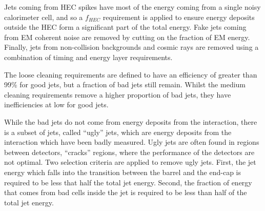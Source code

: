 Jets coming from HEC spikes have most of the energy coming from a single noisy calorimeter cell, and so a $f_{HEC}$ requirement is applied to ensure energy deposits outside the HEC form a significant part of the total energy.
Fake jets coming from EM coherent noise are removed by cutting on the fraction of EM energy.
Finally, jets from non-collision backgrounds and cosmic rays are removed using a combination of timing and energy layer requirements.

The loose cleaning requirements are defined to have an efficiency of greater than 99\% for good jets, but a fraction of bad jets still remain. 
Whilst the medium cleaning requirements remove a higher proportion of bad jets, they have inefficiencies at low \pt{} for good jets. 

While the bad jets do not come from energy deposits from the interaction, there is a subset of jets, called ``ugly'' jets, which are energy deposits from the interaction which have been badly measured. 
Ugly jets are often found in regions between detectors, ``cracks'' regions, where the performance of the detectors are not optimal.
Two selection criteria are applied to remove ugly jets.
First, the jet energy which falls into the transition between the barrel and the end-cap is required to be less that half the total jet energy.
Second, the fraction of energy that comes from bad cells inside the jet is required to be less than half of the total jet energy.


